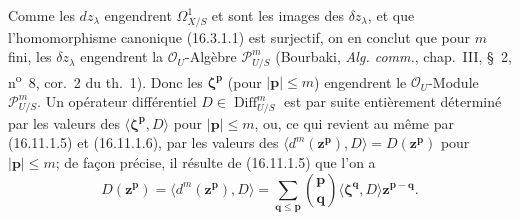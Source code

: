 \begin{env}[16.11.1]
Comme les $dz_\lambda$ engendrent $\varOmega_{X/S}^1$ et sont les images des
$\delta z_\lambda$, et que l'homomorphisme canonique (16.3.1.1) est
surjectif, on en conclut que pour $m$ fini, les $\delta z_\lambda$ engendrent
la $\mathcal{O}_U$-Algèbre $\mathscr{P}_{U/S}^m$ (Bourbaki,
\emph{Alg. comm.}, chap.~III, §~2, n\textsuperscript{o}~8, cor.~2 du th.~1).
Donc les $\boldsymbol{\zeta}^{\mathbf{p}}$ (pour $|\mathbf{p}|\leq m$)
engendrent le $\mathcal{O}_U$-Module $\mathscr{P}_{U/S}^m$. Un opérateur
différentiel $D\in\operatorname{Diff}_{U/S}^m$ est par suite entièrement
déterminé par les valeurs des
$\langle\boldsymbol{\zeta}^{\mathbf{p}},D\rangle$ pour
$|\mathbf{p}|\leq m$, ou, ce qui revient au même par (16.11.1.5) et
(16.11.1.6), par les valeurs
des $\langle d^m(\mathbf{z}^{\mathbf{p}}),D\rangle=D(\mathbf{z}^{\mathbf{p}})$
pour $|\mathbf{p}|\leq m$; de façon précise, il résulte de (16.11.1.5) que
l'on a
\[
  D(\mathbf{z}^{\mathbf{p}})
  =\langle d^m(\mathbf{z}^{\mathbf{p}}),D\rangle
  =\sum_{\mathbf{q}\leq\mathbf{p}}
    \binom{\mathbf{p}}{\mathbf{q}}
    \langle\boldsymbol{\zeta}^{\mathbf{q}},D\rangle
    \mathbf{z}^{\mathbf{p}-\mathbf{q}}.
  \tag{16.11.1.7}
  \label{IV.16.11.1.7}
\]
\end{env}


